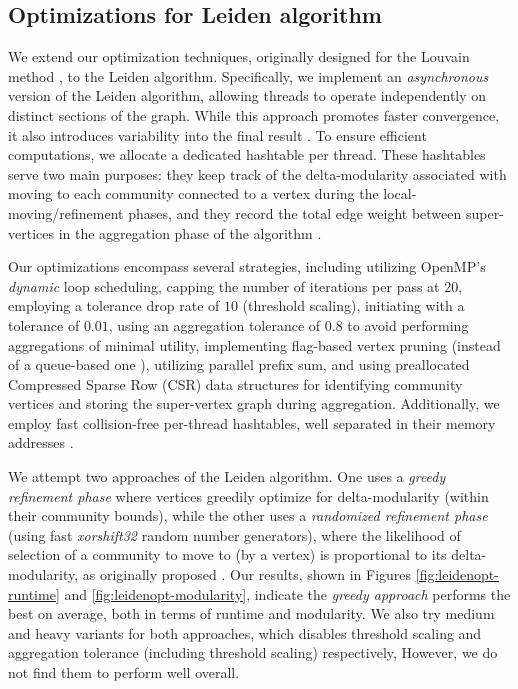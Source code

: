 \subsection{Optimizations for Leiden algorithm}
\label{sec:leiden}

We extend our optimization techniques, originally designed for the Louvain method \cite{sahu2023gvelouvain}, to the Leiden algorithm. Specifically, we implement an \textit{asynchronous} version of the Leiden algorithm, allowing threads to operate independently on distinct sections of the graph. While this approach promotes faster convergence, it also introduces variability into the final result \cite{com-shi21}. To ensure efficient computations, we allocate a dedicated hashtable per thread. These hashtables serve two main purposes: they keep track of the delta-modularity associated with moving to each community connected to a vertex during the local-moving/refinement phases, and they record the total edge weight between super-vertices in the aggregation phase of the algorithm \cite{sahu2023gvelouvain}.

Our optimizations encompass several strategies, including utilizing OpenMP's \textit{dynamic} loop scheduling, capping the number of iterations per pass at $20$, employing a tolerance drop rate of $10$ (threshold scaling), initiating with a tolerance of $0.01$, using an aggregation tolerance of $0.8$ to avoid performing aggregations of minimal utility, implementing flag-based vertex pruning (instead of a queue-based one \cite{nguyenleiden}), utilizing parallel prefix sum, and using preallocated Compressed Sparse Row (CSR) data structures for identifying community vertices and storing the super-vertex graph during aggregation. Additionally, we employ fast collision-free per-thread hashtables, well separated in their memory addresses \cite{sahu2023gvelouvain}.

We attempt two approaches of the Leiden algorithm. One uses a \textit{greedy refinement phase} where vertices greedily optimize for delta-modularity (within their community bounds), while the other uses a \textit{randomized refinement phase} (using fast \textit{xorshift32} random number generators), where the likelihood of selection of a community to move to (by a vertex) is proportional to its delta-modularity, as originally proposed \cite{com-traag19}. Our results, shown in Figures \ref{fig:leidenopt-runtime} and \ref{fig:leidenopt-modularity}, indicate the \textit{greedy approach} performs the best on average, both in terms of runtime and modularity. We also try medium and heavy variants for both approaches, which disables threshold scaling and aggregation tolerance (including threshold scaling) respectively, However, we do not find them to perform well overall.

